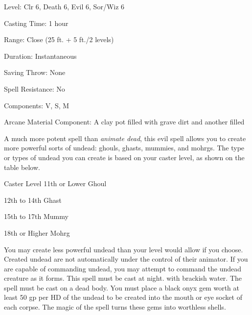 
\begin{description*}
\item[Level:] Clr 6, Death 6, Evil 6, Sor/Wiz 6
\item[Casting Time:] 1 hour
\item[Range:] Close (25 ft. + 5 ft./2 levels)
\item[Duration:] Instantaneous
\item[Saving Throw:] None
\item[Spell Resistance:] No
\item[Components:] V, S, M
\item[Arcane Material Component:] A clay pot filled with grave dirt and another filled
\end{description*}

A much more potent spell than \textit{animate dead}, this evil spell allows you
to create more powerful sorts of undead: ghouls, ghasts, mummies, and mohrgs. The
type or types of undead you can create is based on your caster level, as shown
on the table below.
\begin{description*}
\item[Caster Level 11th or Lower] Ghoul
\item[12th to 14th] Ghast
\item[15th to 17th] Mummy
\item[18th or Higher] Mohrg
\end{description*}
You may create less powerful undead than your level would allow if you choose.
Created undead are not automatically under the control of their animator. If you
are capable of commanding undead, you may attempt to command the undead creature
as it forms.
This spell must be cast at night.
with brackish water. The spell must be cast on a dead body. You must place a black
onyx gem worth at least 50 gp per HD of the undead to be created into the mouth
or eye socket of each corpse. The magic of the spell turns these gems into worthless
shells.